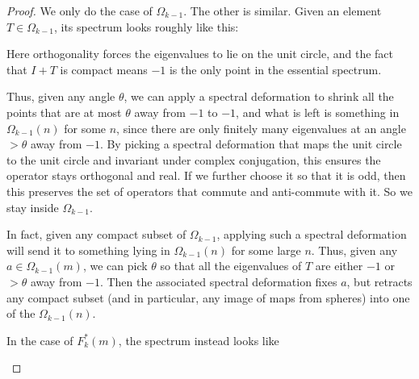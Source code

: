\documentclass{shortart}
\theoremstyle{definition}
\begin{document}
\begin{proof}
  We only do the case of $\Omega_{k - 1}$. The other is similar. Given an element $T \in \Omega_{k - 1}$, its spectrum looks roughly like this:
  \begin{center}
  \end{center}
  Here orthogonality forces the eigenvalues to lie on the unit circle, and the fact that $I + T$ is compact means $-1$ is the only point in the essential spectrum.

  Thus, given any angle $\theta$, we can apply a spectral deformation to shrink all the points that are at most $\theta$ away from $-1$ to $-1$, and what is left is something in $\Omega_{k - 1}(n)$ for some $n$, since there are only finitely many eigenvalues at an angle $> \theta$ away from $-1$. By picking a spectral deformation that maps the unit circle to the unit circle and invariant under complex conjugation, this ensures the operator stays orthogonal and real. If we further choose it so that it is odd, then this preserves the set of operators that commute and anti-commute with it. So we stay inside $\Omega_{k - 1}$.

  In fact, given any compact subset of $\Omega_{k - 1}$, applying such a spectral deformation will send it to something lying in $\Omega_{k - 1}(n)$ for some large $n$. Thus, given any $a \in \Omega_{k - 1}(m)$, we can pick $\theta$ so that all the eigenvalues of $T$ are either $-1$ or $>\theta$ away from $-1$. Then the associated spectral deformation fixes $a$, but retracts any compact subset (and in particular, any image of maps from spheres) into one of the $\Omega_{k - 1}(n)$.

  In the case of $F_k^*(m)$, the spectrum instead looks like
  \begin{center}
  \end{center}
  \qedshift
\end{proof}
\end{document}
